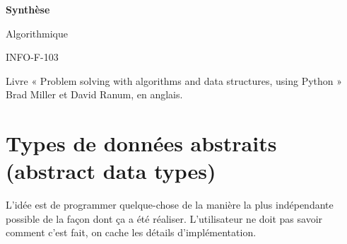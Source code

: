 \documentclass[10pt]{article}
\begin{document}
    \begin{titlepage}
    \centering
    \vspace*{\fill}
    \huge\bfseries
    Synthèse
    
    Algorithmique
    
    INFO-F-103
    \vspace*{\fill}
    \end{titlepage}
\tableofcontents
\newpage
\noindent Livre « Problem solving with algorithms and data structures, using Python » Brad Miller et David Ranum, en anglais.

\section{Types de données abstraits (abstract data types)}
L'idée est de programmer quelque-chose de la manière la plus indépendante possible de la façon dont ça a été réaliser. L'utilisateur ne doit pas savoir comment c'est fait, on cache les détails d'implémentation.
\end{document}
